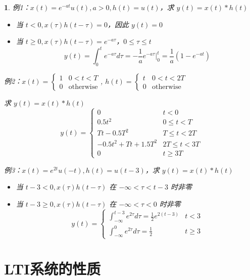 \documentclass[UTF8]{report}
\theoremstyle{MyLineTheoremStyle} %
\theoremstyle{MyBlockTheoremStyle} %
\theoremstyle{MySubsubsectionStyle} %
\newtheorem{definition}{}
\begin{document}
\begin{definition}
    \item 例1：$x(t) = e^{-at}u(t), a > 0, h(t) = u(t)$，求 $y(t) = x(t) * h(t)$
    \begin{itemize}
        \item 当 $t < 0, x(\tau) h(t - \tau) = 0$，因此 $y(t) = 0$
        \item 当 $t \geq 0, x(\tau) h(t - \tau) = e^{-a\tau}$，$0 \leq \tau \leq t$
        \[
        y(t) = \int_{0}^{t} e^{-a\tau} d\tau = -\frac{1}{a} e^{-a\tau} \Big|_{0}^{t} = \frac{1}{a} (1 - e^{-at})
        \]
    \end{itemize}

    \item 例2：$x(t) = \begin{cases} 
    1 & 0 < t < T \\
    0 & \text{otherwise} 
    \end{cases}$, \;$h(t) = \begin{cases} 
    t & 0 < t < 2T \\
    0 & \text{otherwise} 
    \end{cases}$\par
    求 $y(t) = x(t) * h(t)$
    \[
    y(t) = \begin{cases} 
    0 & t < 0 \\
    0.5t^2 & 0 \leq t < T \\
    Tt - 0.5T^2 & T \leq t < 2T \\
    -0.5t^2 + Tt + 1.5T^2 & 2T \leq t < 3T \\
    0 & t \geq 3T 
    \end{cases}
    \]

    \item 例3：$x(t) = e^{2t}u(-t), h(t) = u(t - 3)$，求 $y(t) = x(t) * h(t)$
    \begin{itemize}
        \item 当 $t - 3 < 0, x(\tau) h(t - \tau)$ 在 $-\infty < \tau < t - 3$ 时非零
        \item 当 $t - 3 \geq 0, x(\tau) h(t - \tau)$ 在 $-\infty < \tau < 0$ 时非零
        \[
        y(t) = \begin{cases} 
        \int_{-\infty}^{t-3} e^{2\tau} d\tau = \frac{1}{2} e^{2(t-3)} & t < 3 \\
        \int_{-\infty}^{0} e^{2\tau} d\tau = \frac{1}{2} & t \geq 3 
        \end{cases}
        \]
    \end{itemize}
\end{definition}

\section{LTI系统的性质}
\end{document}
